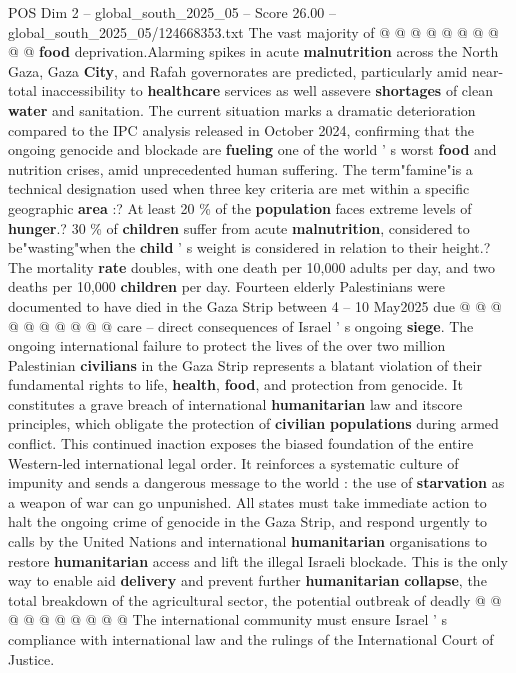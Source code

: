 \begin{textsample}{POS Dim 2 – global\_south\_2025\_05 – Score 26.00 – global\_south\_2025\_05/124668353.txt}
The vast majority of @ @ @ @ @ @ @ @ @ @ \textbf{food} deprivation.Alarming spikes in acute \textbf{malnutrition} across the North Gaza, Gaza \textbf{City}, and Rafah governorates are predicted, particularly amid near-total inaccessibility to \textbf{healthcare} services as well assevere \textbf{shortages} of clean \textbf{water} and sanitation.
The current situation marks a dramatic deterioration compared to the IPC analysis released in October 2024, confirming that the ongoing genocide and blockade are \textbf{fueling} one of the world ' s worst \textbf{food} and nutrition crises, amid unprecedented human suffering.
The term"famine"is a technical designation used when three key criteria are met within a specific geographic \textbf{area} :?
At least 20 \% of the \textbf{population} faces extreme levels of \textbf{hunger}.? 30 \% of \textbf{children} suffer from acute \textbf{malnutrition}, considered to be"wasting"when the \textbf{child} ' s weight is considered in relation to their height.?
The mortality \textbf{rate} doubles, with one death per 10,000 adults per day, and two deaths per 10,000 \textbf{children} per day.
Fourteen elderly Palestinians were documented to have died in the Gaza Strip between 4 -- 10 May2025 due @ @ @ @ @ @ @ @ @ @ care -- direct consequences of Israel ' s ongoing \textbf{siege}.
The ongoing international failure to protect the lives of the over two million Palestinian \textbf{civilians} in the Gaza Strip represents a blatant violation of their fundamental rights to life, \textbf{health}, \textbf{food}, and protection from genocide.
It constitutes a grave breach of international \textbf{humanitarian} law and itscore principles, which obligate the protection of \textbf{civilian} \textbf{populations} during armed conflict.
This continued inaction exposes the biased foundation of the entire Western-led international legal order.
It reinforces a systematic culture of impunity and sends a dangerous message to the world : the use of \textbf{starvation} as a weapon of war can go unpunished.
All states must take immediate action to halt the ongoing crime of genocide in the Gaza Strip, and respond urgently to calls by the United Nations and international \textbf{humanitarian} organisations to restore \textbf{humanitarian} access and lift the illegal Israeli blockade.
This is the only way to enable aid \textbf{delivery} and prevent further \textbf{humanitarian} \textbf{collapse}, the total breakdown of the agricultural sector, the potential outbreak of deadly @ @ @ @ @ @ @ @ @ @ The international community must ensure Israel ' s compliance with international law and the rulings of the International Court of Justice.

\end{textsample}
